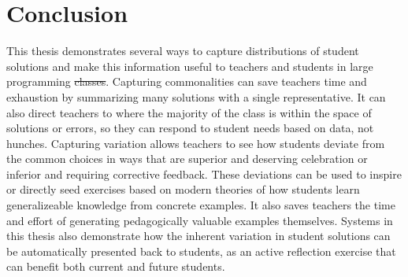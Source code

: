\documentclass[12pt,twoside]{mitthesis}
\providecommand{\DIFaddtex}[1]{{\protect\color{blue}\uwave{#1}}} %
\providecommand{\DIFdeltex}[1]{{\protect\color{red}\sout{#1}}}                      %
\providecommand{\DIFaddbegin}{} %
\providecommand{\DIFaddend}{} %
\providecommand{\DIFdelbegin}{} %
\providecommand{\DIFdelend}{} %
\providecommand{\DIFadd}[1]{\texorpdfstring{\DIFaddtex{#1}}{#1}} %
\providecommand{\DIFdel}[1]{\texorpdfstring{\DIFdeltex{#1}}{}} %
\begin{document}




\DIFdelend \chapter{Conclusion}\label{chapter:conclusion}

This thesis demonstrates several ways to capture distributions of student solutions and make this information useful to teachers and students in large programming \DIFdelbegin \DIFdel{classes}\DIFdelend \DIFaddbegin \DIFadd{courses}\DIFaddend . Capturing commonalities can save teachers time and exhaustion by summarizing many solutions with a single representative. It can also direct teachers to where the majority of the class is within the space of solutions or errors, so they can respond to student needs based on data, not hunches. Capturing variation allows teachers to see how students deviate from the common choices in ways that are superior and deserving celebration or inferior and requiring corrective feedback. These deviations can be used to inspire or directly seed exercises based on modern theories of how students learn generalizeable knowledge from concrete examples. It also saves teachers the time and effort of generating pedagogically valuable examples themselves. Systems in this thesis also demonstrate how the inherent variation in student solutions can be automatically presented back to students, as an active reflection exercise that can benefit both current and future students. 
\end{document}
